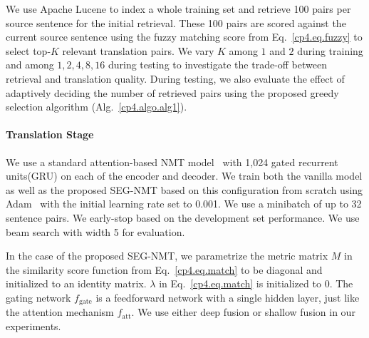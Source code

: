 We use Apache Lucene to index a whole training set and retrieve 100 pairs per source sentence for the initial retrieval. These 100 pairs are scored against the current source sentence using the fuzzy matching score from Eq.~\eqref{cp4.eq.fuzzy} to select top-$K$ relevant translation pairs. We vary $K$ among $1$ and $2$ during training and among $1, 2, 4, 8, 16$ during testing to investigate the trade-off between retrieval and translation quality. During testing, we also evaluate the effect of adaptively deciding the number of retrieved pairs using the proposed greedy selection algorithm (Alg.~\ref{cp4.algo.alg1}). 

\paragraph{Translation Stage}

We use a standard attention-based NMT model~\citep{bahdanau2014neural} with 1,024 gated recurrent units(GRU)\citep{cho2014learning} on each of the encoder and decoder. We train both the vanilla model as well as the proposed SEG-NMT based on this configuration from scratch using Adam~\citep{kingma2014adam} with the initial learning rate set to 0.001. We use a minibatch of up to 32 sentence pairs. We early-stop based on the development set performance. We use beam search with width 5 for evaluation.

In the case of the proposed SEG-NMT, we parametrize the metric matrix $M$ in the similarity score function from Eq.~\eqref{cp4.eq.match} to be diagonal and initialized to an identity matrix. $\lambda$ in Eq.~\eqref{cp4.eq.match} is initialized to $0$. The gating network $f_{\text{gate}}$ is a feedforward network with a single hidden layer, just like the attention mechanism $f_{\text{att}}$. We use either deep fusion or shallow fusion in our experiments.

